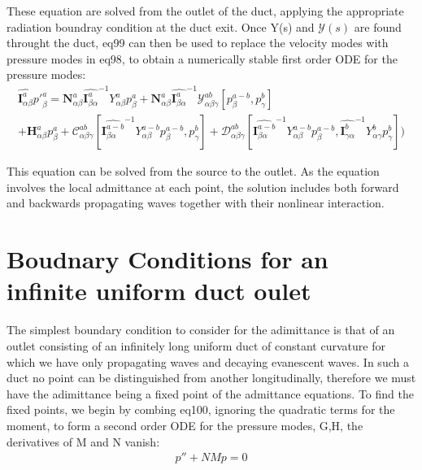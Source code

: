 \documentclass{Note}
\begin{document}
These equation are solved from the outlet of the duct, applying the appropriate radiation boundray condition at the duct exit. Once Y(s) and $\mathcal{Y}(s)$ are found throught the duct, eq99 can then be used to replace the velocity modes with pressure modes in eq98, to obtain a numerically stable first order ODE for the pressure modes:
\begin{equation}
\begin{aligned}
\widehat{\textbf{I}_{\alpha\beta}^a} {p'}_\beta^a=\textbf{N}_{\alpha\beta}^a {\widehat{\textbf{I}_{\beta \alpha}^a}}^{-1}  Y_{\alpha\beta}^a p_\beta^a +\textbf{N}_{\alpha\beta}^a {\widehat{\textbf{I}_{\beta \alpha}^a}}^{-1} \mathcal{Y}_{\alpha\beta\gamma}^{ab}[p_{\beta}^{a-b},p_{\gamma}^{b}]\\
+\textbf{H}_{\alpha\beta}^a p_\beta^a
+\mathcal{C}_{\alpha\beta\gamma}^{ab}[{\widehat{\textbf{I}_{\beta \alpha}^{a-b}}}^{-1}  Y_{\alpha\beta}^{a-b} p_\beta^{a-b} ,p_{\gamma}^{b}]+\mathcal{D}_{\alpha\beta\gamma}^{ab}[{\widehat{\textbf{I}_{\beta \alpha}^{a-b}}}^{-1}  Y_{\alpha\beta}^{a-b} p_\beta^{a-b},{\widehat{\textbf{I}_{\gamma \alpha}^{b}}}^{-1}  Y_{\alpha\gamma}^{b} p_\gamma^{b}])
\end{aligned}
\end{equation}

This equation can be solved from the source to the outlet. As the equation involves the local admittance at each point, the solution includes both forward and backwards propagating waves together with their nonlinear interaction.

\section{Boudnary Conditions for an infinite uniform duct oulet}

The simplest boundary condition to consider for the adimittance is that of an outlet consisting of an infinitely long uniform duct of constant curvature for which we have only propagating waves and decaying evanescent waves. In such a duct no point can be distinguished from another longitudinally, therefore we must have the adimittance being a fixed point of the admittance equations. To find the fixed points, we begin by combing eq100, ignoring the quadratic terms for the moment, to form a second order ODE for the pressure modes, G,H, the derivatives of M and N vanish:
\begin{equation}
\begin{aligned}
p''+NMp=0
\end{aligned}
\end{equation}
\end{document}

